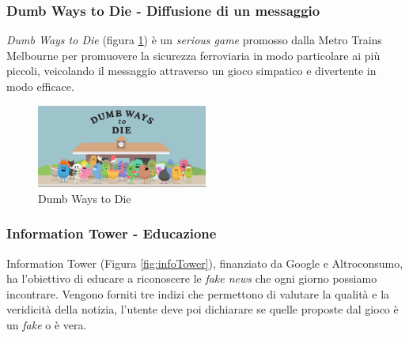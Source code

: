 \subsubsection{Dumb Ways to Die - Diffusione di un messaggio}
\textit{Dumb Ways to Die} \cite{dumbwaytodie} (figura \ref{fig:dumbwaytodie}) è un \textit{serious game} promosso dalla Metro Trains Melbourne per promuovere la sicurezza ferroviaria in modo particolare ai più piccoli, veicolando il messaggio attraverso un gioco simpatico e divertente in modo efficace.
\begin{figure} [h!]
    \center
    \includegraphics[width=0.5\textwidth]{img/dumb-way-to-die.png}
    \caption{Dumb Ways to Die \cite{dumbwaytodie}}
    \label{fig:dumbwaytodie}
\end{figure}

\subsubsection{Information Tower - Educazione}
Information Tower \cite{infoTower} (Figura \ref{fig:infoTower}), finanziato da Google e Altroconsumo, ha l'obiettivo di educare a riconoscere le \textit{fake news} che ogni giorno possiamo incontrare. Vengono forniti tre indizi che permettono di valutare la qualità e la veridicità della notizia, l'utente deve poi dichiarare se quelle proposte dal gioco è un \textit{fake} o è vera. 

